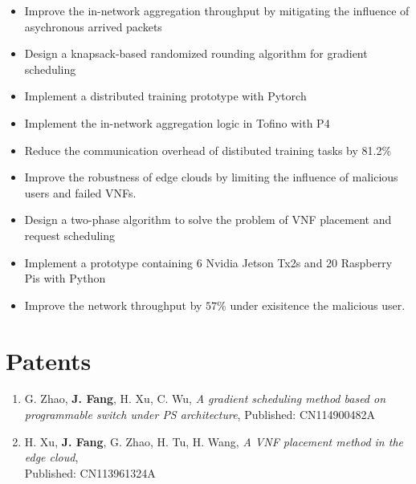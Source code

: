 \documentclass{resume}
\begin{document}
\begin{itemize}
  \item Improve the in-network aggregation throughput by mitigating the influence of asychronous arrived packets
  \item Design a knapsack-based randomized rounding algorithm for gradient scheduling
  \item Implement a distributed training prototype with Pytorch 
  \item Implement the in-network aggregation logic in Tofino with P4 %
  \item Reduce the communication overhead of distibuted training tasks by 81.2\%
\end{itemize}

\begin{itemize}
  \item Improve the robustness of edge clouds by limiting the influence of malicious users and failed VNFs.
  \item Design a two-phase algorithm to solve the problem of VNF placement and request scheduling
  \item Implement a prototype containing 6 Nvidia Jetson Tx2s and 20 Raspberry Pis with Python
  \item Improve the network throughput by $57\%$ under exisitence the malicious user.
\end{itemize}

\section{Patents}

\begin{enumerate}
  \item G. Zhao, \textbf{J. Fang}, H. Xu, C. Wu, \textit{A gradient scheduling method based on programmable switch under PS architecture}, Published: CN114900482A
  \item H. Xu, \textbf{J. Fang}, G. Zhao, H. Tu, H. Wang, \textit{A VNF placement method in the edge cloud}, \\ Published: CN113961324A
\end{enumerate}
\end{document}
